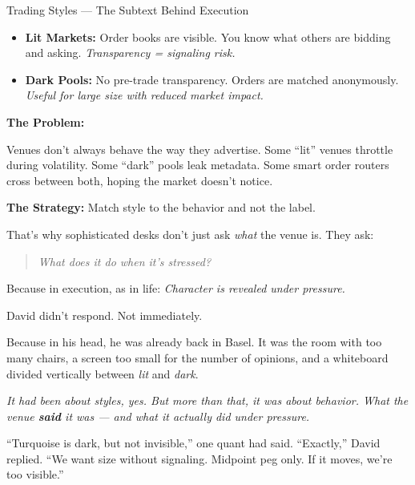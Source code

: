 \begin{TechnicalSidebar}{Trading Styles — The Subtext Behind Execution}
    \medskip
    
    
    \begin{itemize}
      \item \textbf{Lit Markets:} Order books are visible. You know what others are bidding and asking.  
      \textit{Transparency = signaling risk.}
    
      \item \textbf{Dark Pools:} No pre-trade transparency. Orders are matched anonymously.  
      \textit{Useful for large size with reduced market impact.}
    \end{itemize}
    
    \medskip
    
    \textbf{The Problem:}  

    Venues don’t always behave the way they advertise.  
    Some “lit” venues throttle during volatility.  
    Some “dark” pools leak metadata.  
    Some smart order routers cross between both, hoping the market doesn’t notice.
    
    \medskip
    
    \textbf{The Strategy:}  
    Match style to the behavior and not the label.

    \medskip
    
    
    That’s why sophisticated desks don’t just ask \textit{what} the venue is.  
    They ask:  

    \begin{quote}
      \textit{What does it do when it’s stressed?}
    \end{quote}
    
    Because in execution, as in life:  
    \textit{Character is revealed under pressure.}
    
\end{TechnicalSidebar}

\medskip

David didn’t respond. Not immediately.

Because in his head, he was already back in Basel.
It was the room with too many chairs, a screen too small for the number of opinions,
and a whiteboard divided vertically between \textit{lit} and \textit{dark}.

\textit{It had been about styles, yes. But more than that, it was about behavior.
What the venue \textbf{said} it was — and what it actually did under pressure.}


``Turquoise is dark, but not invisible,'' one quant had said.
``Exactly,'' David replied. ``We want size without signaling. Midpoint peg only. If it moves, 
we’re too visible.''


